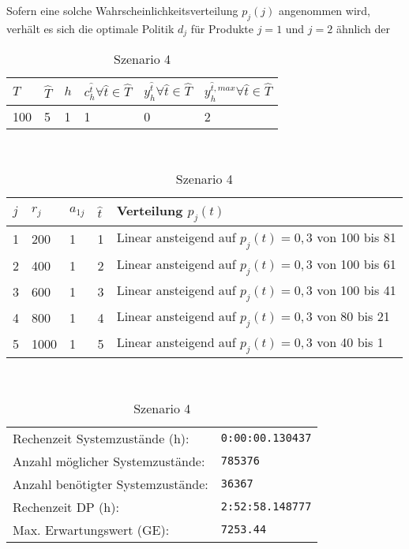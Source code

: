 Sofern eine solche Wahrscheinlichkeitsverteilung $p_j(j)$ angenommen wird, verhält es sich die optimale Politik $d_j$ für Produkte $j=1$ und $j=2$ ähnlich der 




\begin{table}[h!]
\renewcommand{\arraystretch}{1.5}
  \begin{center}
    \caption{Szenario 4}  \label{S4}
    \vspace*{3mm}
    \begin{tabular}{l l l l l l}   %
    $T$ & $\hat T$  & $h$ & $c_h^{\hat t}\forall \hat{t}\in{\hat T}$ & $y_h^{\hat t}\forall \hat{t}\in{\hat T}$  & $y_h^{{\hat t},max}\forall \hat{t}\in{\hat T}$  \\  \hline
100 & 5 & 1 & 1 & 0 & 2  \\ \hline
    \end{tabular} \\[3mm]
        \begin{tabular}{p{.5cm} p{.5cm} p{.5cm}  p{.5cm} p{9cm}}   %
    $j$ & $r_j$  & $a_{1j}$ & $\hat t$ & Verteilung $p_j(t)$ \\  \hline
1 & 200 & 1 & 1 & Linear ansteigend auf $p_j(t)=0,3$ von 100 bis 81   \\
2 & 400 & 1 & 2 & Linear ansteigend auf $p_j(t)=0,3$ von 100 bis 61  \\
3 & 600 & 1 & 3 & Linear ansteigend auf $p_j(t)=0,3$ von 100 bis 41  \\
4 & 800 & 1 & 4 & Linear ansteigend auf $p_j(t)=0,3$ von 80 bis 21  \\
5 & 1000 & 1 & 5 & Linear ansteigend auf $p_j(t)=0,3$ von 40 bis 1 \\
\hline
    \end{tabular} \\[3mm]
     \begin{tabular}{p{7cm}p{5cm}} \hline
     Rechenzeit Systemzustände (h): & \texttt{0:00:00.130437} \\
     Anzahl möglicher Systemzustände: & \texttt{785376} \\
     Anzahl benötigter Systemzustände: & \texttt{36367} \\ 
     Rechenzeit DP (h): & \texttt{2:52:58.148777} \\ 
          Max. Erwartungswert (GE): & \texttt{7253.44} \\ \hline
         \end{tabular} \\[3mm]
  \end{center}
\end{table}

